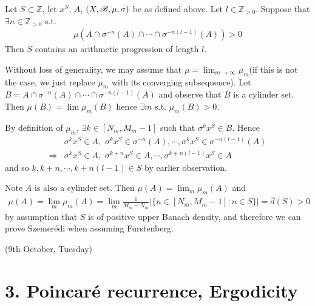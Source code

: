 \documentclass[12pt,a4paper]{report}
\newenvironment{proof}
{\begin{changemargin}{1cm}{0.5cm} 
	}%
	{\end{changemargin}
}
\begin{document}
\prop Let $S\subset\mathbb{Z}$, let $x^S$, $A$, $(X,\mathscr{B}, \mu, \sigma)$ be as defined above. Let $l\in \mathbb{Z}_{>0}$. Suppose that $\exists n \in \mathbb{Z}_{>0}$ s.t.
\begin{align*}
\mu ( A \cap \sigma^{-n}(A) \cap \cdots \cap \sigma^{-n(l-1)}(A) ) >0
\end{align*}
Then $S$ contains an arithmetic progression of length $l$.

\begin{proof}
\pf Without loss of generality, we may assume that $\mu = \lim_{m\rightarrow \infty} \mu_m$(if this is not the case, we just replace $\mu_m$ with its converging subsequence).  Let $B = A \cap \sigma^{-n}(A) \cap \cdots \cap \sigma^{-n(l-1)}(A)$ and observe that $B$ is a cylinder set. Then $\mu(B) = \lim \mu_m(B)$ hence $\exists m$ s.t. $\mu_m (B) >0$.

By definition of $\mu_m$, $\exists k \in [N_m,M_m-1]$ such that $\sigma^k x^S \in B$. Hence
\begin{align*}
&\sigma^k x^S \in A, \,\, \sigma^kx^S \in \sigma^{-n}(A),\cdots,\sigma^k x^S \in \sigma^{-n(l-1)}(A) \\
\Rightarrow &\sigma^k x^S \in A, \,\, \sigma^{k+n}x^S \in A, \cdots,\sigma^{k+n(l-1)} x^S \in A
\end{align*}
and so $k,k+n,\cdots,k+n(l-1) \in S$ by earlier observation.

\eop
\end{proof}
\s

Note $A$ is also a cylinder set. Then $\mu(A)= \lim_{m} \mu_m (A)$ and
\begin{align*}
\mu(A) = \lim_m \mu_m(A) = \lim_m \frac{1}{M_m -N_m} \big| \{ n\in [N_m, M_m-1] : n\in S \} \big| = \bar{d}(S) > 0
\end{align*}
by assumption that $S$ is of positive upper Banach density, and therefore we can prove Szemer\'{e}di when assuming Furstenberg.
\s

\newday

(9th October, Tuesday)
\s

\section*{3. Poincar\'{e} recurrence, Ergodicity}
\end{document}
